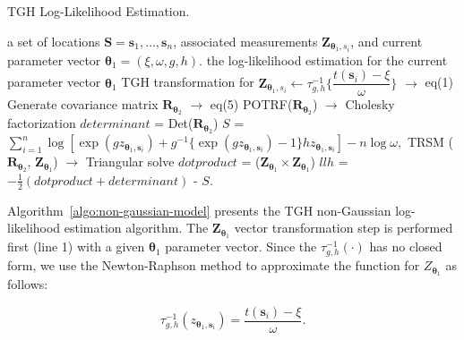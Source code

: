 \documentclass[conference]{IEEEtran}
\begin{document}
\begin{algorithm}[H]
\footnotesize
\caption{TGH Log-Likelihood Estimation.}
\label{algo:non-gaussian-model}
\begin{algorithmic}[1]
 a set of locations $\bm{S} = \bm s_1,\ldots,\bm s_n$,   associated measurements $\bm{Z}_{\bm{\theta}_1,s_i}$, and current parameter vector $\bm{\theta}_1= (\xi, \omega, g, h)$.
 the log-likelihood estimation for the current parameter vector $\bm{\theta}_1$
\STATE TGH transformation for $\bm{Z}_{\bm{\theta}_1,s_i} \leftarrow \tau_{g,h}^{-1} \bigg \{ \dfrac{t(\bm{s}_i) - \xi}{\omega} \bigg \}$ $\rightarrow$ eq(1)
\STATE  Generate covariance matrix $\bm{R}_{\bm{\theta}_2}$
$\rightarrow$ eq(5)
\STATE  POTRF($\bm{R}_{\bm{\theta}_2}$)  $\rightarrow$ Cholesky factorization
\STATE $determinant$ = Det($\bm{R}_{\bm{\theta}_2}$)
\STATE $S$ =  $\sum_{i=1}^n \log [ \exp(g z_{\bm{\theta}_1,\bm{s}_i})+g^{-1} \{ \exp(g z_{\bm{\theta}_1,\bm{s}_i}) -1 \} h z_{\bm{\theta}_1,\bm{s}_i}] -n \log \omega, $
\STATE TRSM ($\bm{R}_{\bm{\theta}_2}$, $\bm{Z}_{\bm{\theta}_1}$) $\rightarrow$ Triangular solve
\STATE  $dotproduct$ = (${\bm{Z}_{\bm{\theta}_1}}\times  \bm{Z}_{\bm{\theta}_1}$)
\STATE $llh$ = $-\frac{1}{2} (dotproduct + determinant)$ - $S$.


\end{algorithmic}
\end{algorithm}

Algorithm~\ref{algo:non-gaussian-model} presents the
TGH non-Gaussian log-likelihood estimation algorithm. 
The $\bm{Z}_{\bm{\theta}_1}$ vector transformation step
is performed first (line 1) with a given $\bm{\theta}_1$ parameter vector. Since the $\tau_{g,h}^{-1}(\cdot)$ has
no closed form, we use the Newton-Raphson method to
approximate the function for $Z_{\bm{\theta}_1}$ as follows:

\begin{equation}
\label{eq:newton}
\tau_{g,h}^{-1}(z_{\bm{\theta}_1, \bm{s}_i}) = \frac{t(\bm{s}_i) -\xi}{\omega}.
\end{equation}

%
\end{document}
